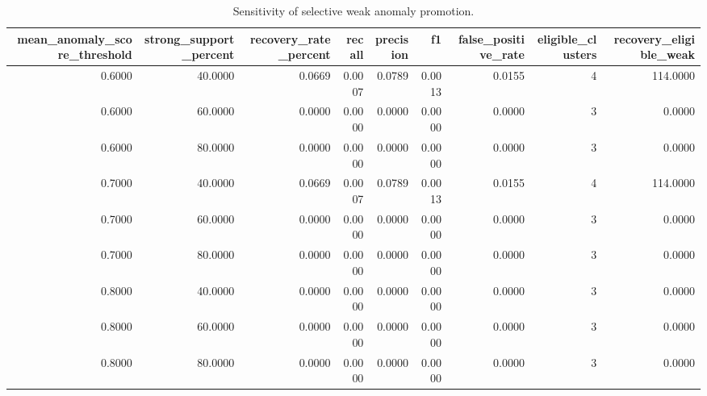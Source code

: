 \begin{table}[t]
\centering
\begin{tabular}{rrrrrrrrr}
\toprule
mean\_anomaly\_score\_threshold & strong\_support\_percent & recovery\_rate\_percent & recall & precision & f1 & false\_positive\_rate & eligible\_clusters & recovery\_eligible\_weak \\
\midrule
0.6000 & 40.0000 & 0.0669 & 0.0007 & 0.0789 & 0.0013 & 0.0155 & 4 & 114.0000 \\
0.6000 & 60.0000 & 0.0000 & 0.0000 & 0.0000 & 0.0000 & 0.0000 & 3 & 0.0000 \\
0.6000 & 80.0000 & 0.0000 & 0.0000 & 0.0000 & 0.0000 & 0.0000 & 3 & 0.0000 \\
0.7000 & 40.0000 & 0.0669 & 0.0007 & 0.0789 & 0.0013 & 0.0155 & 4 & 114.0000 \\
0.7000 & 60.0000 & 0.0000 & 0.0000 & 0.0000 & 0.0000 & 0.0000 & 3 & 0.0000 \\
0.7000 & 80.0000 & 0.0000 & 0.0000 & 0.0000 & 0.0000 & 0.0000 & 3 & 0.0000 \\
0.8000 & 40.0000 & 0.0000 & 0.0000 & 0.0000 & 0.0000 & 0.0000 & 3 & 0.0000 \\
0.8000 & 60.0000 & 0.0000 & 0.0000 & 0.0000 & 0.0000 & 0.0000 & 3 & 0.0000 \\
0.8000 & 80.0000 & 0.0000 & 0.0000 & 0.0000 & 0.0000 & 0.0000 & 3 & 0.0000 \\
\bottomrule
\end{tabular}
\caption{Sensitivity of selective weak anomaly promotion.}
\label{tab:selective-weak-promotion}
\end{table}
